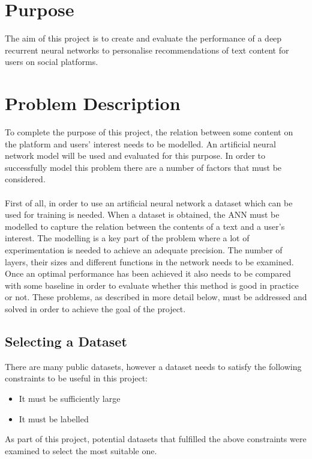 \section{Purpose}
The aim of this project is to create and evaluate the performance of a deep recurrent neural networks to personalise recommendations of text content for users on social platforms.

\section{Problem Description}
To complete the purpose of this project, the relation between some content on the platform and users' interest needs to be modelled. An artificial neural network model will be used and evaluated for this purpose. In order to successfully model this problem there are a number of factors that must be considered.
\\\\
First of all, in order to use an artificial neural network a dataset which can be used for training is needed. When a dataset is obtained, the ANN must be modelled to capture the relation between the contents of a text and a user's interest. The modelling is a key part of the problem where a lot of experimentation is needed to achieve an adequate precision. The number of layers, their sizes and different functions in the network needs to be examined. Once an optimal performance has been achieved it also needs to be compared with some baseline in order to evaluate whether this method is good in practice or not. These problems, as described in more detail below,  must be addressed and solved in order to achieve the goal of the project.

\subsection{Selecting a Dataset}\label{sec:select_dataset}
There are many public datasets, however a dataset needs to satisfy the following constraints to be useful in this project: 
\vspace*{0.25cm}
\begin{itemize}
    \item It must be sufficiently large
    \item It must be labelled
\end{itemize}
\vspace*{0.25cm}
As part of this project, potential datasets that fulfilled the above constraints were examined to select the most suitable one.

